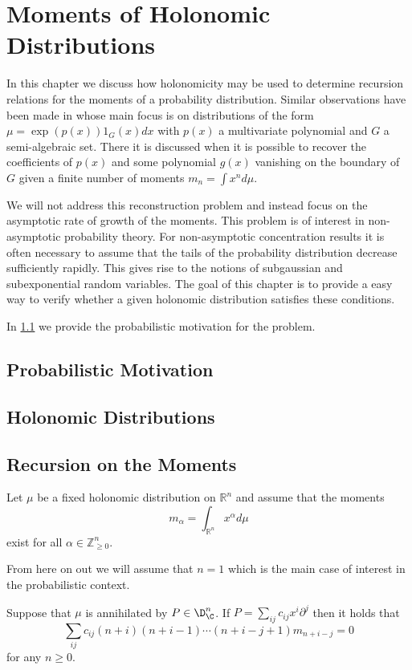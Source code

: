 \chapter{Moments of Holonomic Distributions}
In this chapter we discuss how holonomicity may be used to determine recursion relations for the moments of a probability distribution.
Similar observations have been made in \cite{brehard2019moment} whose main focus is on distributions of the form $\mu = \exp(p(x))1_{G}(x)dx$ with $p(x)$ a multivariate polynomial and $G$ a semi-algebraic set.
There it is discussed when it is possible to recover the coefficients of $p(x)$ and some polynomial $g(x)$ vanishing on the boundary of $G$ given a finite number of moments $m_n = \int x^n d\mu$.

We will not address this reconstruction problem and instead focus on the asymptotic rate of growth of the moments.
This problem is of interest in non-asymptotic probability theory.
For non-asymptotic concentration results it is often necessary to assume that the tails of the probability distribution decrease sufficiently rapidly.
This gives rise to the notions of subgaussian and subexponential random variables.
The goal of this chapter is to provide a easy way to verify whether a given holonomic distribution satisfies these conditions.

In \cref{sec: Motivation} we provide the probabilistic motivation for the problem.




\section{Probabilistic Motivation}\label{sec: Motivation}

\section{Holonomic Distributions}

\section{Recursion on the Moments}
Let $\mu$ be a fixed holonomic distribution on $\mathbb{R}^n$ and assume that the moments
$$m_\alpha = \int_{\mathbb{R}^n} x^\alpha d\mu$$
exist for all $\alpha \in \mathbb{Z}_{\geq 0}^n$.

From here on out we will assume that $n = 1$ which is the main case of interest in the probabilistic context.
\begin{proposition}
  Suppose that $\mu$ is annihilated by $P \in \D_{\C}^n$. If $P = \sum_{ij} c_{ij}x^i \partial^j$ then it holds that
  $$ \sum_{ij} c_{ij} (n+ i)(n+ i -1)\cdots (n+i-j + 1) m_{n + i - j} = 0$$
  for any $n \geq 0$.
\end{proposition}
